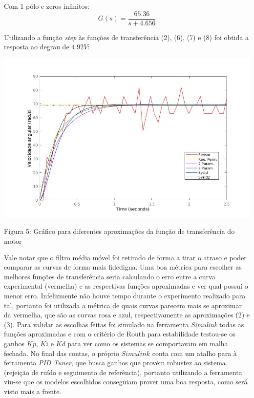 \documentclass{article}
\begin{document}
Com 1 pólo e zeros infinitos:
\begin{equation}
    G(s) = \frac{65.36}{s + 4.656}
\end{equation}

Utilizando a função \textit{step} às funções de transferência (2), (6), (7) e (8) foi obtida a resposta ao degrau de $4.92V$:

\begin{center}
\centering
  \includegraphics[scale=0.5]{imagens/respaoDegrauLinda2Rel.jpg}
  
  \caption{Figura 5: Gráfico para diferentes aproximações da função de transferência do motor}
\end{center}

Vale notar que o filtro média móvel foi retirado de forma a tirar o atraso e poder comparar as curvas de forma mais fidedigna. Uma boa métrica para escolher as melhores funções de transferência seria calculando o erro entre a curva experimental (vermelha) e as respectivas funções aproximadas e ver qual possuí o menor erro. Infelizmente não houve tempo durante o experimento realizado para tal, portanto foi utilizada a métrica de quais curvas parecem mais se aproximar da vermelha, que são as curvas rosa e azul, respectivamente as aproximações (2) e (3).
Para validar as escolhas feitas foi simulado na ferramenta \textit{Simulink} todas as funções aproximadas e com o critério de Routh para estabilidade testou-se os ganhos $Kp$, $Ki$ e $Kd$ para ver como os sistemas se comportavam em malha fechada. No final das contas, o próprio $Simulink$ conta com um atalho para à ferramenta \textit{PID Tuner}, que busca ganhos que provém robustez ao sistema (rejeição de ruído e seguimento de referência), portanto utilizando a ferramenta viu-se que os modelos escolhidos conseguiam prover uma boa resposta, como será visto mais a frente.
\end{document}
